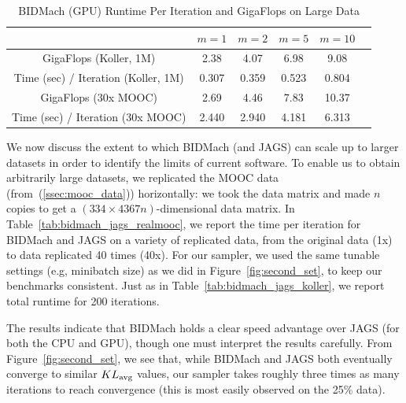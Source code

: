 \documentclass{article} %
\begin{document}
%
%
\begin{table}[t]
\small
\caption{BIDMach (GPU) Runtime Per Iteration and GigaFlops on Large Data}
\label{tab:tradeoff}
\begin{center}
\begin{tabular}{ |c|c|c|c|c|c| } 
\hline
               & $m=1$ & $m=2$ & $m=5$ & $m=10$ \\
\hline \hline
GigaFlops (Koller, 1M)               & 2.38  & 4.07  &  6.98  &  9.08  \\ 
Time (sec) / Iteration (Koller, 1M)  & 0.307 & 0.359 &  0.523 &  0.804 \\
\hline
GigaFlops (30x MOOC)              & 2.69  & 4.46  & 7.83  & 10.37   \\ 
Time (sec) / Iteration (30x MOOC) & 2.440 & 2.940 & 4.181 & 6.313   \\
\hline
\end{tabular}
\end{center}
\end{table}

We now discuss the extent to which BIDMach (and JAGS) can scale up to larger datasets in order to
identify the limits of current software. To enable us to obtain arbitrarily large datasets, we
replicated the MOOC data (from~(\ref{ssec:mooc_data})) horizontally: we took the data matrix and
made $n$ copies to get a $(334 \times 4367n)$-dimensional data matrix. In
Table~\ref{tab:bidmach_jags_realmooc}, we report the time per iteration for BIDMach and JAGS on a
variety of replicated data, from the original data (1x) to data replicated 40 times (40x). For our
sampler, we used the same tunable settings (e.g, minibatch size) as we did in
Figure~\ref{fig:second_set}, to keep our benchmarks consistent. Just as in
Table~\ref{tab:bidmach_jags_koller}, we report total runtime for 200 iterations.

The results indicate that BIDMach holds a clear speed advantage over JAGS (for both the CPU and
GPU), though one must interpret the results carefully. From Figure~\ref{fig:second_set}, we see
that, while BIDMach and JAGS both eventually converge to similar $KL_{\rm avg}$ values, our sampler
takes roughly three times as many iterations to reach convergence (this is most easily observed on
the 25\% data).
\end{document}
